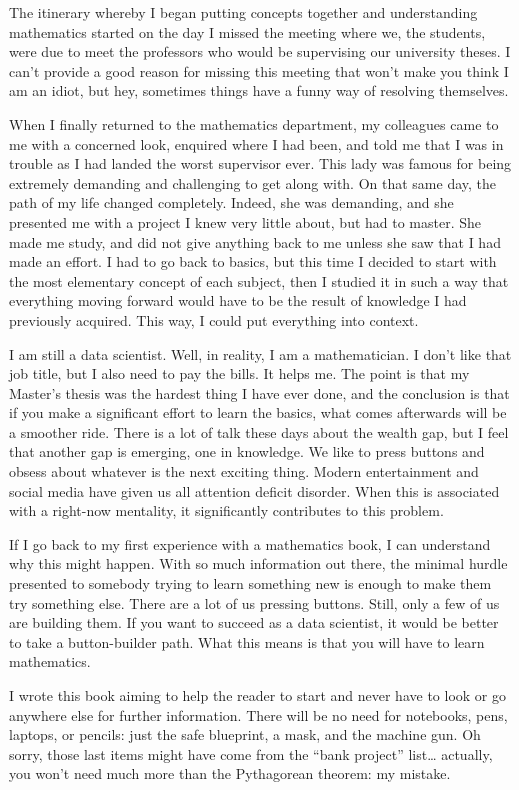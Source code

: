 \documentclass[600paper, 11pt,twoside,openany]{kdp}
\begin{document}
\par 
\vspace{-4pt}
\indent
The itinerary whereby I began putting concepts together and understanding mathematics started on the day I missed the meeting where we, the students, were due to meet the professors who would be supervising our university theses. I can’t provide a good reason for missing this meeting that won’t make you think I am an idiot, but hey, sometimes things have a funny way of resolving themselves. 
\par 
\vspace{-4pt}
\indent
When I finally returned to the mathematics department, my colleagues came to me with a concerned look, enquired where I had been, and told me that I was in trouble as I had landed the worst supervisor ever. This lady was famous for being extremely demanding and challenging to get along with. On that same day, the path of my life changed completely. Indeed, she was demanding, and she presented me with a project I knew very little about, but had to master. She made me study, and did not give anything back to me unless she saw that I had made an effort. I had to go back to basics, but this time I decided to start with the most elementary concept of each subject, then I studied it in such a way that everything moving forward would have to be the result of knowledge I had previously acquired. This way, I could put everything into context.
\par 
\vspace{-4pt}
\indent
I am still a data scientist. Well, in reality, I am a mathematician. I don’t like that job title, but I also need to pay the bills. It helps me. The point is that my Master’s thesis was the hardest thing I have ever done, and the conclusion is that if you make a significant effort to learn the basics, what comes afterwards will be a smoother ride. There is a lot of talk these days about the wealth gap, but I feel that another gap is emerging, one in knowledge. We like to press buttons and obsess about whatever is the next exciting thing. Modern entertainment and social media have given us all attention deficit disorder. When this is associated with a right-now mentality, it significantly contributes to this problem. 
\par 
\vspace{-4pt}
\indent
If I go back to my first experience with a mathematics book, I can understand why this might happen. With so much information out there, the minimal hurdle presented to somebody trying to learn something new is enough to make them try something else. There are a lot of us pressing buttons. Still, only a few of us are building them. If you want to succeed as a data scientist, it would be better to take a button-builder path. What this means is that you will have to learn mathematics. 
\par 
\vspace{-4pt}
\indent
I wrote this book aiming to help the reader to start and never have to look or go anywhere else for further information. There will be no need for notebooks, pens, laptops, or pencils: just the safe blueprint, a mask, and the machine gun. Oh sorry, those last items might have come from the “bank project” list… actually, you won’t need much more than the Pythagorean theorem: my mistake.
\end{document}
